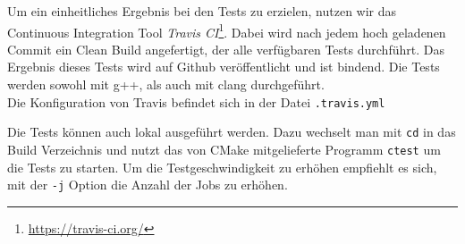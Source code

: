 Um ein einheitliches Ergebnis bei den Tests zu erzielen, nutzen wir das Continuous Integration Tool
\textit{Travis CI}\footnote{\url{https://travis-ci.org/}}. Dabei wird nach jedem hoch geladenen
Commit ein Clean Build angefertigt, der alle verfügbaren Tests durchführt. Das Ergebnis dieses Tests
wird auf Github veröffentlicht und ist bindend. Die Tests werden sowohl mit g++, als auch mit clang
durchgeführt. \\
Die Konfiguration von Travis befindet sich in der Datei \texttt{.travis.yml}

Die Tests können auch lokal ausgeführt werden. Dazu wechselt man mit \texttt{cd} in das Build
Verzeichnis und nutzt das von CMake mitgelieferte Programm \texttt{ctest} um die Tests zu starten.
Um die Testgeschwindigkeit zu erhöhen empfiehlt es sich, mit der \texttt{-j} Option die Anzahl
der Jobs zu erhöhen. 


